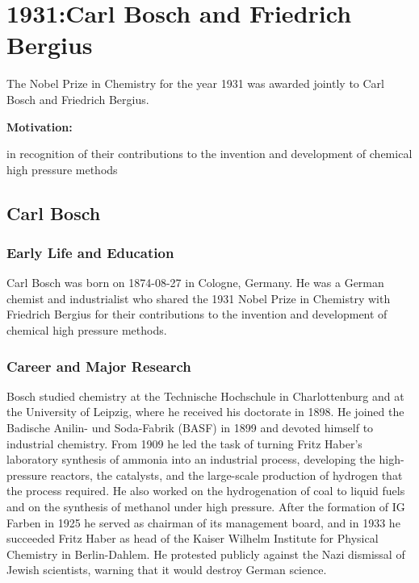 \chapter{1931:Carl Bosch and Friedrich Bergius}

\label{chap:chemistry1931}

The Nobel Prize in Chemistry for the year 1931 was awarded jointly to Carl Bosch and Friedrich Bergius.

\textbf{Motivation:}

in recognition of their contributions to the invention and development of chemical high pressure methods

\section{Carl Bosch}

\subsection*{Early Life and Education}

Carl Bosch was born on 1874-08-27 in Cologne, Germany.
He was a German chemist and industrialist who shared the 1931 Nobel Prize in Chemistry with Friedrich Bergius for their contributions to the invention and development of chemical high pressure methods.

\subsection*{Career and Major Research}

Bosch studied chemistry at the Technische Hochschule in Charlottenburg and at the University of Leipzig, where he received his doctorate in 1898.
He joined the Badische Anilin- und Soda-Fabrik (BASF) in 1899 and devoted himself to industrial chemistry.
From 1909 he led the task of turning Fritz Haber's laboratory synthesis of ammonia into an industrial process, developing the high-pressure reactors, the catalysts, and the large-scale production of hydrogen that the process required.
He also worked on the hydrogenation of coal to liquid fuels and on the synthesis of methanol under high pressure.
After the formation of IG Farben in 1925 he served as chairman of its management board, and in 1933 he succeeded Fritz Haber as head of the Kaiser Wilhelm Institute for Physical Chemistry in Berlin-Dahlem.
He protested publicly against the Nazi dismissal of Jewish scientists, warning that it would destroy German science.

